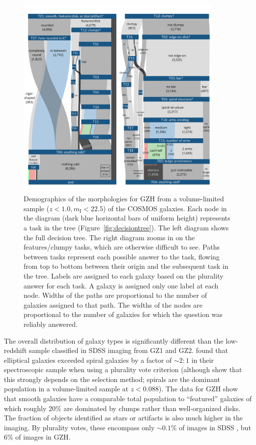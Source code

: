 \documentclass[a4paper,fleqn,usenatbib]{mnras}
\begin{document}
\begin{figure}
\center
\includegraphics[width=0.90\textwidth]{figures/sankey_cosmos.pdf}
\caption{Demographics of the morphologies for GZH from a volume-limited
sample ($z<1.0, m_\mathrm{I}<22.5$) of the COSMOS galaxies. Each node in the diagram (dark blue horizontal
bars of uniform height) represents a task in the tree (Figure~\ref{fig:decisiontree}). The left diagram shows
the full decision tree. The right diagram zooms in on the features/clumpy
tasks, which are otherwise difficult to see. Paths between tasks represent
each possible answer to the task, flowing from top to bottom between their
origin and the subsequent task in the tree. Labels are assigned to
each galaxy based on the plurality answer for each task. A galaxy is assigned
only one label at each node. Widths of the paths are proportional to the number
of galaxies assigned to that path. The widths of the nodes are proportional to
the number of galaxies for which the question was reliably answered.}
\label{fig:sankey}
\end{figure}

The overall distribution of galaxy types is significantly different than the
low-redshift sample classified in SDSS imaging from GZ1 and GZ2. \citet{lin11}
found that elliptical galaxies exceeded spiral galaxies by a factor of
$\sim2:1$ in their spectroscopic sample when using a plurality vote criterion
(although \citealt{bam09} show that this strongly depends on the selection
method; spirals are the dominant population in a volume-limited sample at
$z<0.088$). The data for GZH show that smooth galaxies have a comparable total
population to ``featured'' galaxies of which roughly 20\% are dominated by
clumps rather than well-organized disks.  The fraction of objects identified as
stars or artifacts is also much higher in the \hst{} imaging. By plurality
votes, these encompass only $\sim0.1\%$ of images in SDSS \citep{wil13}, but
6\% of images in GZH. 
\end{document}
